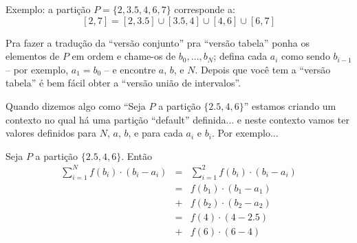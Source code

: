 \documentclass[oneside,12pt]{article}
\begin{document}
{{

\msk

Exemplo: a partição $P=\{2,3.5,4,6,7\}$ corresponde a:
%
$$[2,7] = [2,3.5]∪[3.5,4]∪[4,6]∪[6,7]$$



Pra fazer a tradução da ``versão conjunto'' pra ``versão tabela''
ponha os elementos de $P$ em ordem e chame-os de $b_0,\ldots,b_N$;
defina cada $a_i$ como sendo $b_{i-1}$ -- por exemplo, $a_1 = b_0$ --
e encontre $a$, $b$, e $N$. Depois que você tem a ``versão tabela'' é
bem fácil obter a ``versão união de intervalos''.

\bsk

Quando dizemos algo como ``Seja $P$ a partição $\{2.5,4,6\}$'' estamos
criando um contexto no qual há uma partição ``default'' definida... e
neste contexto vamos ter valores definidos para $N$, $a$, $b$, e para
cada $a_i$ e $b_i$. Por exemplo...

\msk

Seja $P$ a partição $\{2.5,4,6\}$. Então
%
$$\begin{array}{rcl}
  \sum_{i=1}^N f(b_i)·(b_i-a_i)
     &=& \sum_{i=1}^2 f(b_i)·(b_i-a_i) \\
     &=& f(b_1)·(b_1-a_1) \\
     &+& f(b_2)·(b_2-a_2) \\
     &=& f(4)·(4-2.5) \\
     &+& f(6)·(6-4) \\
  \end{array}
$$


}}


\newpage



\end{document}
